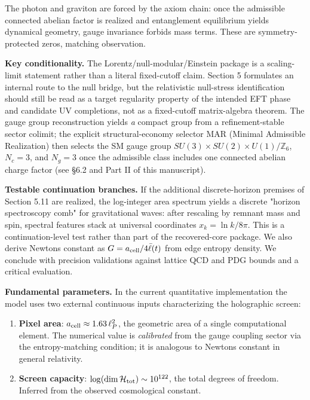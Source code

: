 The photon and graviton are forced by the axiom chain: once the admissible connected abelian factor is realized and entanglement equilibrium yields dynamical geometry, gauge invariance forbids mass terms. These are symmetry-protected zeros, matching observation.

\textbf{Key conditionality.} The Lorentz/null-modular/Einstein package is a scaling-limit statement rather than a literal fixed-cutoff claim. Section 5 formulates an internal route to the null bridge, but the relativistic null-stress identification should still be read as a target regularity property of the intended EFT phase and candidate UV completions, not as a fixed-cutoff matrix-algebra theorem. The gauge group reconstruction yields \emph{a} compact group from a refinement-stable sector colimit; the explicit structural-economy selector MAR (Minimal Admissible Realization) then selects the SM gauge group \(SU(3) \times SU(2) \times U(1)/\mathbb{Z}_6\), \(N_c = 3\), and \(N_g = 3\) once the admissible class includes one connected abelian charge factor (see §6.2 and Part II of this manuscript).

\textbf{Testable continuation branches.} If the additional discrete-horizon premises of Section 5.11 are realized, the log-integer area spectrum yields a discrete "horizon spectroscopy comb" for gravitational waves: after rescaling by remnant mass and spin, spectral features stack at universal coordinates \(x_k = \ln k / 8\pi\). This is a continuation-level test rather than part of the recovered-core package. We also derive Newton\textquotesingle s constant as \(G = a_{\rm cell}/4\bar{\ell}(t)\) from edge entropy density. We conclude with precision validations against lattice QCD and PDG bounds and a critical evaluation.

\textbf{Fundamental parameters.} In the current quantitative implementation the model uses two external continuous inputs characterizing the holographic screen:

\begin{enumerate}
\def\labelenumi{\arabic{enumi}.}
\item
  \textbf{Pixel area}: \(a_{\rm cell} \approx 1.63\,\ell_P^2\), the geometric area of a single computational element. The numerical value is \emph{calibrated} from the gauge coupling sector via the entropy-matching condition; it is analogous to Newton\textquotesingle s constant in general relativity.
\item
  \textbf{Screen capacity}: \(\log(\dim\mathcal{H}_{\rm tot}) \sim 10^{122}\), the total degrees of freedom. Inferred from the observed cosmological constant.
\end{enumerate}

